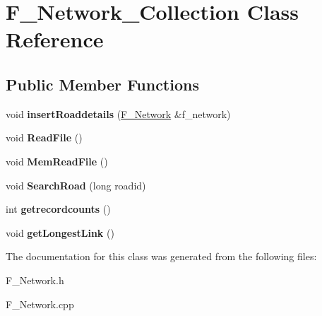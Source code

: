 \hypertarget{classF__Network__Collection}{}\section{F\+\_\+\+Network\+\_\+\+Collection Class Reference}
\label{classF__Network__Collection}
\subsection*{Public Member Functions}
\begin{DoxyCompactItemize}
\item 
void {\bfseries insert\+Roaddetails} (\hyperlink{classF__Network}{F\+\_\+\+Network} \&f\+\_\+network)\hypertarget{classF__Network__Collection_acbb5b8f727443818a49bd893a179b9e1}{}\label{classF__Network__Collection_acbb5b8f727443818a49bd893a179b9e1}

\item 
void {\bfseries Read\+File} ()\hypertarget{classF__Network__Collection_adb385312ed27b8afd89468ab96b044e3}{}\label{classF__Network__Collection_adb385312ed27b8afd89468ab96b044e3}

\item 
void {\bfseries Mem\+Read\+File} ()\hypertarget{classF__Network__Collection_a048b7329817baae78d77358e0f2b646b}{}\label{classF__Network__Collection_a048b7329817baae78d77358e0f2b646b}

\item 
void {\bfseries Search\+Road} (long roadid)\hypertarget{classF__Network__Collection_ad2e4ab1730a5f91a2db9b6631d952845}{}\label{classF__Network__Collection_ad2e4ab1730a5f91a2db9b6631d952845}

\item 
int {\bfseries getrecordcounts} ()\hypertarget{classF__Network__Collection_a8135ac0b8e688114b4e00bc091d95858}{}\label{classF__Network__Collection_a8135ac0b8e688114b4e00bc091d95858}

\item 
void {\bfseries get\+Longest\+Link} ()\hypertarget{classF__Network__Collection_ae1261c472762182b40607ec1d7b5c7bb}{}\label{classF__Network__Collection_ae1261c472762182b40607ec1d7b5c7bb}

\end{DoxyCompactItemize}


The documentation for this class was generated from the following files\+:\begin{DoxyCompactItemize}
\item 
F\+\_\+\+Network.\+h\item 
F\+\_\+\+Network.\+cpp\end{DoxyCompactItemize}
